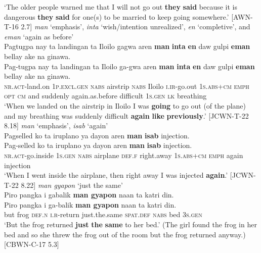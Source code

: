     \glt `The older people warned me that I will not go out \textbf{they} \textbf{said} because it is dangerous \textbf{they} \textbf{said} for one(s) to be married to keep going somewhere.’ [AWN-T-16 2.7]
\z
\ea
\textit{man} ‘emphasis’, \textit{inta} ‘wish/intention unrealized’, \textit{en} ‘completive’, and  \textit{eman} ‘again as before’ \\
Pagtugpa  nay  ta    landingan  ta  Iloilo  gagwa  aren \textbf{man}  \textbf{inta}  \textbf{en}  daw  gulpi  \textbf{eman}  bellay  ake  na  ginawa. \\\smallskip
 \gll Pag-tugpa  nay  ta    landingan  ta  Iloilo  ga-gwa  aren \textbf{man}  \textbf{inta}  \textbf{en}  daw  gulpi  \textbf{eman}  bellay  ake  na  ginawa. \\
\textsc{nr.act}-land.on  1\textsc{p.excl.gen}  \textsc{nabs}  airstrip  \textsc{nabs}  Iloilo  \textsc{i.ir}-go.out  1\textsc{s.abs+cm}
\textsc{emph}  \textsc{opt}  \textsc{cm}  and  suddenly  again.as.before  difficult  1\textsc{s.gen}  \textsc{lk}  breathing \\
\glt `When we landed on the airstrip in Iloilo I was \textbf{going} to go out (of the plane) and my breathing was suddenly difficult \textbf{again} \textbf{like} \textbf{previously}.’ [JCWN-T-22 8.18]
\z
\ea
\textit{man} ‘emphasis’, \textit{isab} ‘again’ \\
Pagselled  ko  ta  iruplano  ya  dayon  aren \textbf{man}  \textbf{isab}  injection. \\\smallskip
 \gll Pag-selled  ko  ta  iruplano  ya  dayon  aren \textbf{man}  \textbf{isab}  injection. \\
\textsc{nr.act}-go.inside  1\textsc{s.gen}  \textsc{nabs}  airplane  \textsc{def.f}  right.away  1\textsc{s.abs+cm} \textsc{emph}  again  injection \\
\glt `When I went inside the airplane, then right away I was injected \textbf{again}.’ [JCWN-T-22 8.22]
\z
\ea
\textit{man gyapon}  ‘just the same’ \\
Piro  pangka  i  gabalik  \textbf{man  gyapon}  naan  ta  katri  din. \\\smallskip
 \gll Piro  pangka  i  ga-balik  \textbf{man  gyapon}  naan  ta  katri  din. \\
but  frog  \textsc{def.n}  \textsc{i.r}-return  just.the.same   \textsc{spat.def}  \textsc{nabs}  bed  3\textsc{s.gen} \\
\glt ‘But the frog returned \textbf{just} \textbf{the} \textbf{same} to her bed.’ (The girl found the frog in her bed and so she threw the frog out of the room but the frog returned anyway.) [CBWN-C-17 5.3] 
\z

